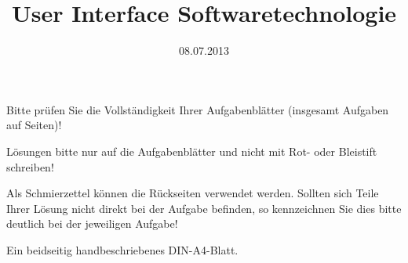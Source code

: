\documentclass{../../uulm-exam}
\begin{document}
\title{User Interface Softwaretechnologie}
\date{08.07.2013}

\begin{hints}
\begin{hintslist}
\item Bitte prüfen Sie die Vollständigkeit Ihrer Aufgabenblätter
(insgesamt \gettotalassignments{} Aufgaben auf \pageref{LastPage} Seiten)!
\item Lösungen bitte nur auf die Aufgabenblätter und nicht mit Rot- oder
Bleistift schreiben!
\item Als Schmierzettel können die Rückseiten verwendet werden.
Sollten sich Teile Ihrer Lösung nicht direkt bei der Aufgabe befinden, so
kennzeichnen Sie dies bitte deutlich bei der jeweiligen Aufgabe!
\end{hintslist}
\end{hints}

\begin{tools}
Ein beidseitig handbeschriebenes DIN-A4-Blatt.
\end{tools}

\maketitle

\begin{assignments}


\end{assignments}

\newpage
\makeemptysheet
\makeemptysheet
\makeemptysheet

% 
\end{document}
